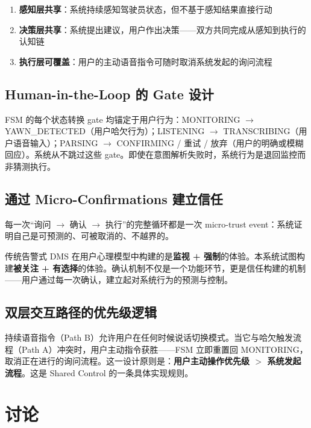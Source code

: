 \documentclass[12pt,a4paper]{ctexart}
\begin{document}
\begin{enumerate}[label=\arabic*.]
    \item \textbf{感知层共享}：系统持续感知驾驶员状态，但不基于感知结果直接行动
    \item \textbf{决策层共享}：系统提出建议，用户作出决策——双方共同完成从感知到执行的认知链
    \item \textbf{执行层可覆盖}：用户的主动语音指令可随时取消系统发起的询问流程
\end{enumerate}

\subsection{Human-in-the-Loop 的 Gate 设计}

FSM 的每个状态转换 gate 均锚定于用户行为：MONITORING $\rightarrow$ YAWN\_DETECTED（用户哈欠行为）；LISTENING $\rightarrow$ TRANSCRIBING（用户语音输入）；PARSING $\rightarrow$ CONFIRMING / 重试 / 放弃（用户的明确或模糊回应）。系统从不跳过这些 gate。即使在意图解析失败时，系统行为是退回监控而非猜测执行。

\subsection{通过 Micro-Confirmations 建立信任}

每一次“询问 $\rightarrow$ 确认 $\rightarrow$ 执行”的完整循环都是一次 micro-trust event：系统证明自己是可预测的、可被取消的、不越界的。

传统告警式 DMS 在用户心理模型中构建的是\textbf{监视 + 强制}的体验。本系统试图构建\textbf{被关注 + 有选择}的体验。确认机制不仅是一个功能环节，更是信任构建的机制——用户通过每一次确认，建立起对系统行为的预测与控制。

\subsection{双层交互路径的优先级逻辑}

持续语音指令（Path B）允许用户在任何时候说话切换模式。当它与哈欠触发流程（Path A）冲突时，用户主动指令获胜——FSM 立即重置回 MONITORING，取消正在进行的询问流程。这一设计原则是：\textbf{用户主动操作优先级 $>$ 系统发起流程}。这是 Shared Control 的一条具体实现规则。

\section{讨论}
\end{document}
